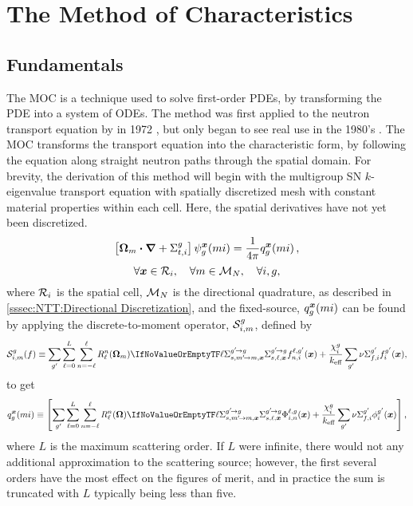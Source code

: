 \chapter{The Method of Characteristics}{\label{ch:The Method of Characteristics}
    
    
    
    \def\figpath{chapters/MOC/figures/}
    \graphicspath{ {\figpath} }

    \section{Fundamentals}{\label{sec:MOC:Fundamentals}
        The \acf{MOC} is a technique used to solve first-order \acp{PDE}, by transforming the \ac{PDE} into a system of \acp{ODE}.
        The method was first applied to the neutron transport equation by \citeauthor{Askew1972} in 1972 \cite{Askew1972}, but only began to see real use in the 1980's \cite{Halsall1980}.
        The \ac{MOC} transforms the transport equation into the characteristic form, by following the equation along straight neutron paths through the spatial domain.
        For brevity, the derivation of this method will begin with the multigroup \ac{SN} $k$-eigenvalue transport equation with spatially discretized mesh with constant material properties within each cell.
        Here, the spatial derivatives have not yet been discretized.
        \begin{equation}\label{eq:MOC:SSMGFS Transport}
            \left[\dirm\vdot\grad + \xst\right]\aflux[mi][g][\loc] = \rfourpi\source[mi][g][\loc],
        \end{equation}
        \begin{equation*}
            \forall\loc\in\Region, \quad \forall m \in \angquad, \quad \forall i, g,
        \end{equation*}
        where $\Region$ is the spatial cell, $\angquad$ is the directional quadrature, as described in \cref{sssec:NTT:Directional Discretization}, and the fixed-source, $
        \source[mi][g][\loc]$ can be found by applying the discrete-to-moment operator, $\FluxToSource$, defined by
        \begin{equation}\label{eq:MOC:LSA:Flux To Source Operator}
          \FluxToSource(f) \defined
            \suml[\gprime]\suml[\ell=0][L]\suml[n=-\ell][\ell]\SH[\ell][n][\dirm]\xss[\ell]f^{\ell,\gprime}_{n,i}(\loc)
            + \frac{\spect}{\keff}\suml[\gprime]\nufis f^{\gprime}_{i}(\loc),
        \end{equation}
        to get
        \begin{equation}\label{eq:MOC:Source}
            \source[mi][g][\loc] \defined
                \left[\suml[\gprime]\suml[\ell=0][L]\suml[n=-\ell][\ell]\SH\xss[\ell]\afluxmom(\loc) + \frac{\spect}{\keff}\suml[\gprime]\nufis\sflux[\gprime](\loc)\right],
        \end{equation}
        where $L$ is the maximum scattering order.
        If $L$ were infinite, there would not any additional approximation to the scattering source; however, the first several orders have the most effect on the figures of merit, and in practice the sum is truncated with $L$ typically being less than five.

}}
